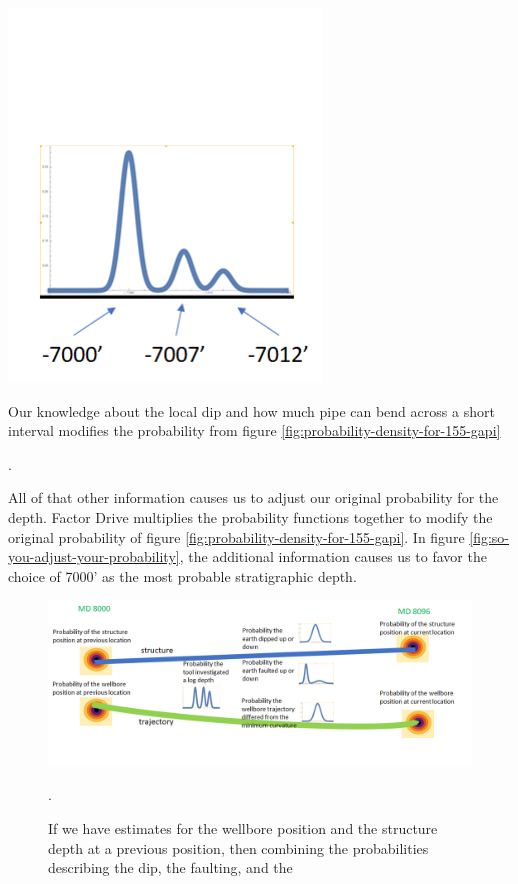 \documentclass{tufte-handout}
\begin{document}
\begin{marginfigure}
  \includegraphics{so-you-adjust-your-probability.png}
   \caption{Our knowledge about the local dip and how much pipe can bend across a short interval 
  modifies the probability from figure \ref{fig:probability-density-for-155-gapi}}.
  \label{fig:so-you-adjust-your-probability}
\end{marginfigure}

All of that other information causes us to adjust our original probability for the 
depth. Factor Drive multiplies the probability functions together to modify the original
probability of figure \ref{fig:probability-density-for-155-gapi}. In figure \ref{fig:so-you-adjust-your-probability}, the additional information causes us to favor
the choice of 7000' as the most probable stratigraphic depth.

\begin{figure}
    \includegraphics[width=\linewidth]{neighboring-stations.png}
    \caption{If we have estimates for the wellbore position and the structure depth at a previous
    position, then combining the probabilities describing the dip, the faulting, and the }.
    \label{fig:neighboring-stations}
\end{figure}
\end{document}
